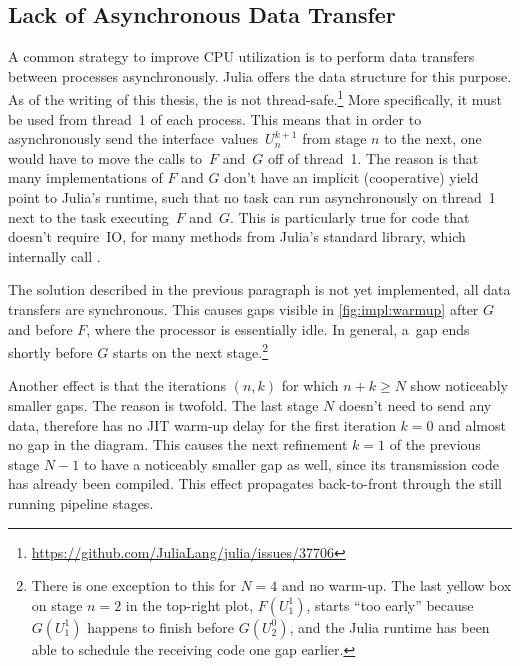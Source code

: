\subsection{Lack of Asynchronous Data Transfer}
\label{sec:impl:pr:sync}

A common strategy to improve CPU utilization is to perform data transfers between processes asynchronously.
Julia offers the  data structure for this purpose.
As of the writing of this thesis,
the  is not thread-safe.\footnote{\url{https://github.com/JuliaLang/julia/issues/37706}}
More specifically, it must be used from thread~1 of each process.
This means that in order to asynchronously send the interface~values~$U_n^{k+1}$ from stage $n$ to the next,
one would have to move the calls to~$F$ and~$G$ off of thread~1.
The reason is that many implementations of $F$ and $G$ don't have an implicit (cooperative) yield point to Julia's runtime,
such that no task can run asynchronously on thread~1 next to the task executing~$F$ and~$G$.
This is particularly true for code that doesn't require~\ac{IO},
\eg for many methods from Julia's  standard library,
which internally call .

The solution described in the previous paragraph is not yet implemented,
\ie all data transfers are synchronous.
This causes gaps visible in \autoref{fig:impl:warmup} after $G$ and before $F$,
where the processor is essentially idle.
In general, a~gap ends shortly before $G$ starts on the next stage.\footnote{%
  There is one exception to this for $N=4$ and no warm-up.
  The last yellow box on stage $n=2$ in the top-right plot, $F(U_1^1)$,
  starts \enquote{too early} because $G(U_1^1)$ happens to finish before $G(U_2^0)$,
  and the Julia runtime has been able to schedule the receiving code one gap earlier.
}

Another effect is that the iterations $(n,k)$ for which $n+k \geq N$ show noticeably smaller gaps.
The reason is twofold.
The last stage $N$ doesn't need to send any data,
therefore has no \ac{JIT} warm-up delay for the first iteration $k=0$ and almost no gap in the diagram.
This causes the next refinement $k=1$ of the previous stage $N-1$ to have a noticeably smaller gap as well,
since its transmission code has already been compiled.
This effect propagates back-to-front through the still running pipeline stages.


